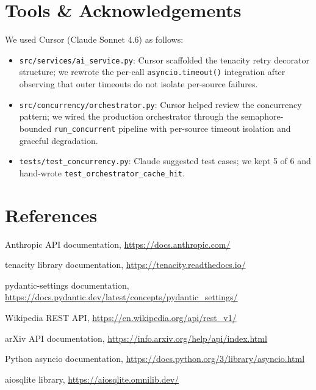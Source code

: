 \documentclass[11pt,a4paper]{article}
\begin{document}
\section{Tools \& Acknowledgements}\label{sec:tools}

We used Cursor (Claude Sonnet 4.6) as follows:
\begin{itemize}
  \item \texttt{src/services/ai\_service.py}: Cursor scaffolded the tenacity retry decorator structure; we rewrote the per-call \texttt{asyncio.timeout()} integration after observing that outer timeouts do not isolate per-source failures.
  \item \texttt{src/concurrency/orchestrator.py}: Cursor helped review the concurrency pattern; we wired the production orchestrator through the semaphore-bounded \texttt{run\_concurrent} pipeline with per-source timeout isolation and graceful degradation.
  \item \texttt{tests/test\_concurrency.py}: Claude suggested test cases; we kept 5 of 6 and hand-wrote \texttt{test\_orchestrator\_cache\_hit}.
\end{itemize}

\section*{References}

\begin{enumerate}[label={[\arabic*]},leftmargin=2.4em,itemsep=2pt]
  \item Anthropic API documentation, \url{https://docs.anthropic.com/}
  \item tenacity library documentation, \url{https://tenacity.readthedocs.io/}
  \item pydantic-settings documentation, \url{https://docs.pydantic.dev/latest/concepts/pydantic_settings/}
  \item Wikipedia REST API, \url{https://en.wikipedia.org/api/rest_v1/}
  \item arXiv API documentation, \url{https://info.arxiv.org/help/api/index.html}
  \item Python asyncio documentation, \url{https://docs.python.org/3/library/asyncio.html}
  \item aiosqlite library, \url{https://aiosqlite.omnilib.dev/}
\end{enumerate}
\end{document}
